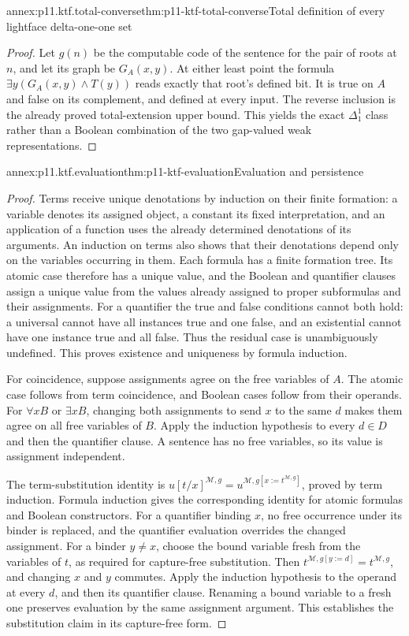\begin{annexitem}{annex:p11.ktf.total-converse}{thm:p11-ktf-total-converse}{Total definition of every lightface delta-one-one set}
\begin{proof}
Let \(g(n)\) be the computable code of the sentence for the
pair of roots at \(n\), and let its graph be \(G_A(x,y)\).
At either least point the formula
\(\exists y(G_A(x,y)\land T(y))\) reads exactly that root's
defined bit. It is true on \(A\) and false on its complement,
and defined at every input. The reverse inclusion is the already
proved total-extension upper bound. This yields the exact
\(\Delta^1_1\) class rather than a Boolean combination of
the two gap-valued weak representations.
\end{proof}
\end{annexitem}

\begin{annexitem}{annex:p11.ktf.evaluation}{thm:p11-ktf-evaluation}{Evaluation and persistence}
\begin{proof}
Terms receive unique denotations by induction on their finite formation:
a variable denotes its assigned object, a constant its fixed interpretation,
and an application of a function uses the already determined denotations
of its arguments. An induction on terms also shows that their denotations
depend only on the variables occurring in them. Each formula has a finite
formation tree. Its atomic case therefore has a unique value, and the
Boolean and quantifier clauses assign a unique value from the values
already assigned to proper subformulas and their assignments. For a
quantifier the true and false conditions cannot both hold: a universal
cannot have all instances true and one false, and an existential cannot
have one instance true and all false. Thus the residual case is unambiguously
undefined. This proves existence and uniqueness by formula induction.

For coincidence, suppose assignments agree on the free variables of
\(A\). The atomic case follows from term coincidence, and Boolean
cases follow from their operands. For \(\forall x B\) or \(\exists x B\),
changing both assignments to send \(x\) to the same \(d\) makes them
agree on all free variables of \(B\). Apply the induction hypothesis
to every \(d\in D\) and then the quantifier clause. A sentence has
no free variables, so its value is assignment independent.

The term-substitution identity is
\(u[t/x]^{\mathcal M,g}=u^{\mathcal M,g[x:=t^{\mathcal M,g}]}\),
proved by term induction. Formula induction gives the corresponding
identity for atomic formulas and Boolean constructors. For a quantifier
binding \(x\), no free occurrence under its binder is replaced, and
the quantifier evaluation overrides the changed assignment. For a binder
\(y\ne x\), choose the bound variable fresh from the variables of
\(t\), as required for capture-free substitution. Then
\(t^{\mathcal M,g[y:=d]}=t^{\mathcal M,g}\), and changing \(x\)
and \(y\) commutes. Apply the induction hypothesis to the operand
at every \(d\), and then its quantifier clause. Renaming a bound variable
to a fresh one preserves evaluation by the same assignment argument.
This establishes the substitution claim in its capture-free form.


\end{proof}
\end{annexitem}
